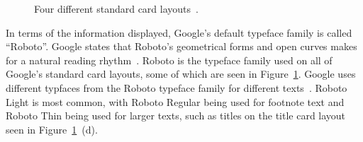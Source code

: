 	\begin{figure}[ht!]
		\centering
  	 \qquad
	\qquad
   	\qquad
   	\qquad
		\caption{Four different standard card layouts~\cite{cardLayout}.}
		\label{cardLayouts}
	\end{figure}

In terms of the information displayed, Google's default typeface family is called ``Roboto''. Google states that Roboto's geometrical forms and open curves makes for a natural reading rhythm~\cite{googleTypefaceRoboto}. Roboto is the typeface family used on all of Google's standard card layouts, some of which are seen in Figure~\ref{cardLayouts}. Google uses different typfaces from the Roboto typeface family for different texts~\cite{glassDesignStyle}. Roboto Light is most common, with Roboto Regular being used for footnote text and Roboto Thin being used for larger texts, such as titles on the title card layout seen in Figure~\ref{cardLayouts}~(d).

